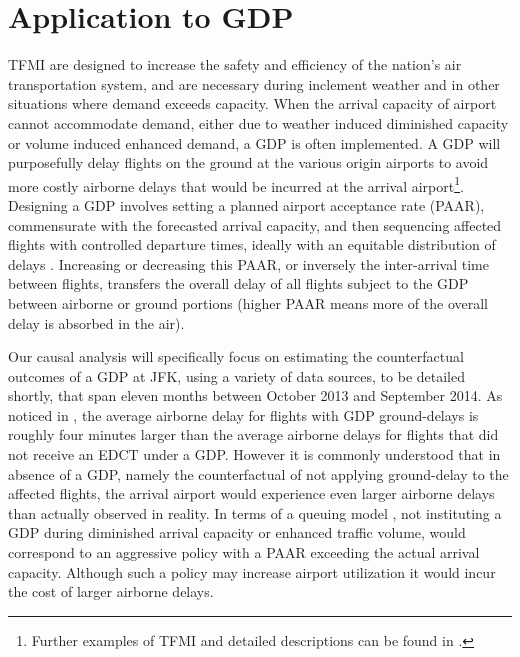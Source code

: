 \documentclass[conference]{IEEEtran}
\begin{document}
\section{Application to GDP}
TFMI are designed to increase the safety and efficiency of the nation's air transportation system, and are necessary during inclement weather and in other situations where demand exceeds capacity.  When the arrival capacity of airport cannot accommodate demand, either due to weather induced diminished capacity or volume induced enhanced demand, a GDP is often implemented.  A GDP will purposefully delay flights on the ground at the various origin airports to avoid more costly airborne delays that would be incurred at the arrival airport\footnote{Further examples of TFMI and detailed descriptions can be found in \cite{faatfm}.}. Designing a GDP involves setting a planned airport acceptance rate (PAAR), commensurate with the forecasted arrival capacity, and then sequencing affected flights with controlled departure times, ideally with an equitable distribution of delays \cite{ball2001analysis}.  Increasing or decreasing this PAAR, or inversely the inter-arrival time between flights, transfers the overall delay of all flights subject to the GDP between airborne or ground portions (higher PAAR means more of the overall delay is absorbed in the air).  

Our causal analysis will specifically focus on estimating the counterfactual outcomes of a GDP at JFK, using a variety of data sources, to be detailed shortly, that span eleven months between October 2013 and September 2014. As noticed in \cite{bilimoria2016analysis}, the average airborne delay for flights with GDP ground-delays is roughly four minutes larger than the average airborne delays for flights that did not receive an EDCT under a GDP.  However it is commonly understood that in absence of a GDP, namely the counterfactual of not applying  ground-delay to the affected flights, the arrival airport would experience even larger airborne delays than actually observed in reality.  In terms of a queuing model \cite{ball2001analysis}, not instituting a GDP during diminished arrival capacity or enhanced traffic volume, would correspond to an aggressive policy with a PAAR exceeding the actual arrival capacity.  Although such a policy may increase airport utilization it would incur the cost of larger airborne delays.  
\end{document}

